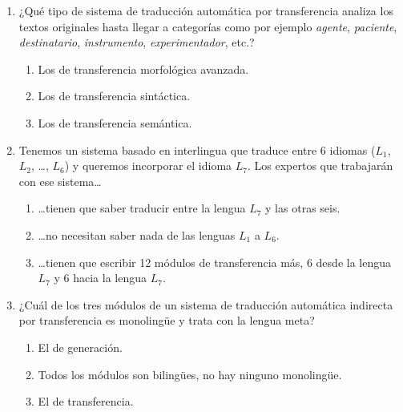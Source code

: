 \begin{enumerate}
\item ¿Qué tipo de sistema de traducción automática por transferencia analiza los textos originales hasta llegar a categorías como por ejemplo \emph{agente}, \emph{paciente}, \emph{destinatario}, \emph{instrumento}, \emph{experimentador}, etc.? \begin{enumerate} \item Los de transferencia morfológica avanzada. \item Los de transferencia sintáctica. \item Los de transferencia semántica. \end{enumerate} 

\item Tenemos un sistema basado en interlingua que traduce entre 6 idiomas ($L_1$, $L_2$, \ldots, $L_6$) y queremos incorporar el idioma $L_7$. Los expertos que trabajarán con ese sistema\ldots \begin{enumerate} \item \ldots tienen que saber traducir entre la lengua $L_7$ y las otras seis. \item \ldots no necesitan saber nada de las lenguas $L_1$ a $L_6.$ \item \ldots tienen que escribir 12 módulos de transferencia más, 6 desde la lengua $L_7$ y 6 hacia la lengua $L_7$. \end{enumerate} 

\item ¿Cuál de los tres módulos de un sistema de traducción automática indirecta por transferencia es monolingüe y trata con la lengua meta? \begin{enumerate} \item El de generación. \item Todos los módulos son bilingües, no hay ninguno monolingüe. \item El de transferencia. \end{enumerate} 


\end{enumerate}

